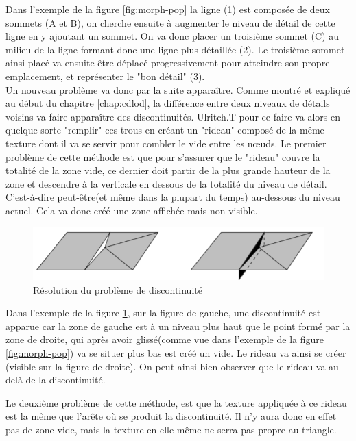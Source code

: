\newpage
  Dans l'exemple de la figure \ref{fig:morph-pop} la ligne (1) est composée de deux sommets (A et B), on cherche ensuite à augmenter le niveau de détail de cette ligne en y ajoutant un sommet. On va donc placer un troisième sommet (C) au milieu de la ligne formant donc une ligne plus détaillée (2). Le troisième sommet ainsi placé va ensuite être déplacé progressivement pour atteindre son propre emplacement, et représenter le "bon détail" (3).\\

 Un nouveau problème va donc par la suite apparaître. Comme montré et expliqué au début du chapitre \ref{chap:cdlod}, la différence entre deux niveaux de détails voisins va faire apparaître des discontinuités. Ulritch.T pour ce faire va alors en quelque sorte "remplir" ces trous en créant un "rideau" composé de la même texture dont il va se servir pour combler le vide entre les n\oe{}uds.
 Le premier problème de cette méthode est que pour s'assurer que le "rideau" couvre la totalité de la zone vide, ce dernier doit partir de la plus grande hauteur de la zone et descendre à la verticale en dessous de la totalité du niveau de détail. C'est-à-dire peut-être(et même dans la plupart du temps) au-dessous du niveau actuel. Cela va donc créé une zone affichée mais non visible.

 \begin{figure}[!ht]
    \includegraphics[width=12cm]{img/skirt.png}
    \caption[morph]{ Résolution du problème de discontinuité \protect\footnotemark}
    \label{fig:skirt}
\end{figure}

Dans l'exemple de la figure \ref{fig:skirt}, sur la figure de gauche, une discontinuité est apparue car la zone de gauche est à un niveau plus haut que le point formé par la zone de droite, qui après avoir glissé(comme vue dans l'exemple de la figure \ref{fig:morph-pop}) va se situer plus bas est créé un vide.
Le rideau va ainsi se créer (visible sur la figure de droite). On peut ainsi bien observer que le rideau va au-delà de la discontinuité.

Le deuxième problème de cette méthode, est que la texture appliquée à ce rideau est la même que l'arête où se produit la discontinuité. Il n'y aura donc en effet pas de zone vide, mais la texture en elle-même ne serra pas propre au triangle.